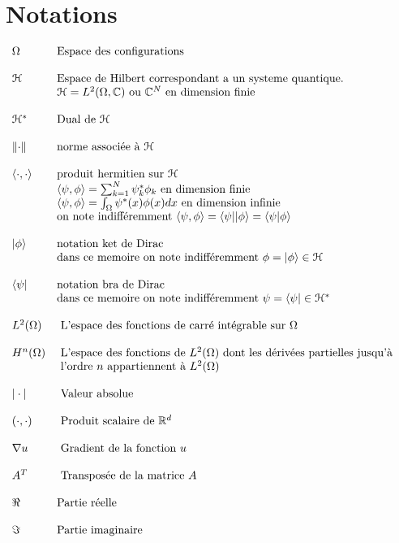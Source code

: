 \chapter*{Notations}
$
\begin{array}{ll}
\Omega & \mbox{Espace des configurations}\\\\
\mathcal{H} & \mbox{Espace de Hilbert correspondant a un systeme quantique.}\\
& \mathcal{H} = L^2(\Omega, \mathbb C) \mbox{ ou } \mathbb C^N  \mbox{ en dimension finie}\\\\
\mathcal{H^*} & \mbox{Dual de } \mathcal{H}\\\\
\lVert\cdot\rVert &  \mbox{norme associée à } \mathcal{H}\\\\
\langle\cdot,\cdot\rangle & \mbox{produit hermitien sur } \mathcal{H}\\
& \langle\psi,\phi\rangle=\sum_{k=1}^{N} \psi^*_k \phi_k \mbox{ en dimension finie}\\
& \langle\psi,\phi\rangle=\int_{\Omega} \psi^*(x) \phi(x) dx \mbox{ en dimension infinie}\\
&\mbox{on note indifféremment } \langle\psi,\phi\rangle = \langle\psi||\phi\rangle = \langle\psi|\phi\rangle\\\\
| \phi \rangle & \mbox{notation ket de Dirac}\\
& \mbox{dans ce memoire on note indifféremment } \phi = | \phi \rangle \in \mathcal{H}\\\\
\langle \psi | & \mbox{notation bra de Dirac}\\
& \mbox{dans ce memoire on note indifféremment } \psi = \langle  \psi | \in \mathcal{H^*}\\\\
L^2(\Omega) & \mbox{ L'espace des fonctions de carré intégrable sur } \Omega\\\\
H^n(\Omega) & \mbox{ L’espace des fonctions de }L^2(\Omega) \mbox{ dont les dérivées partielles jusqu’à }\\
&\mbox{ l’ordre } n \mbox{ appartiennent à } L^2(\Omega)\\\\
|\cdot| & \mbox{ Valeur absolue}\\\\
\left(\cdot,\cdot \right) & \mbox{ Produit scalaire de }\mathbb{R}^d\\\\
\nabla u & \mbox{ Gradient de la fonction } u\\\\
A^T & \mbox{ Transposée de la matrice } A\\\\
\Re & \mbox{Partie réelle}\\\\
\Im & \mbox{Partie imaginaire}
\end{array}
$
